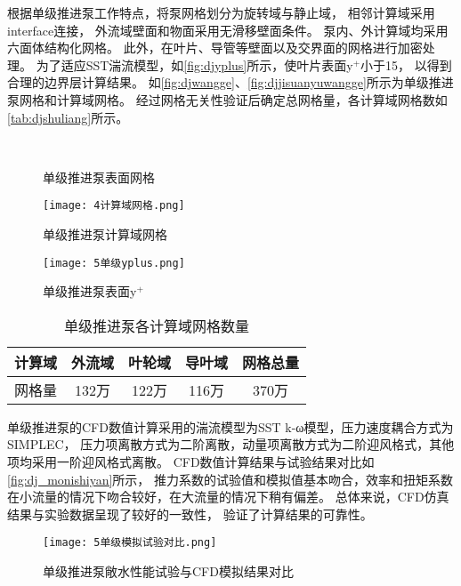 根据单级推进泵工作特点，将泵网格划分为旋转域与静止域，
相邻计算域采用interface连接，
外流域壁面和物面采用无滑移壁面条件。
泵内、外计算域均采用六面体结构化网格。
此外，在叶片、导管等壁面以及交界面的网格进行加密处理。
为了适应SST湍流模型，如\autoref{fig:djyplus}所示，使叶片表面y$^+$小于15，
以得到合理的边界层计算结果。
如\autoref{fig:djwangge}、\autoref{fig:djjisuanyuwangge}所示为单级推进泵网格和计算域网格。
经过网格无关性验证后确定总网格量，各计算域网格数如\autoref{tab:djshuliang}所示。
\begin{figure}[htbp]
    \centering
    \caption{\label{fig:djwangge}单级推进泵表面网格}
\end{figure}
\begin{figure}[htbp]
    \centering
    \texttt{[image: 4计算域网格.png]}
    \caption{\label{fig:djjisuanyuwangge}单级推进泵计算域网格}
\end{figure}
\begin{figure}[htbp]
    \centering
    \texttt{[image: 5单级yplus.png]}
    \caption{\label{fig:djyplus}单级推进泵表面y$^+$}
\end{figure}
\begin{table}[htbp]
    \centering
    \caption{\label{tab:djshuliang}单级推进泵各计算域网格数量}
    \begin{tabular}{ccccc}
        \toprule
        计算域 & 外流域 & 叶轮域 & 导叶域  & 网格总量 \\
        \midrule
        网格量 & 132万 & 122万 & 116万 & 370万 \\
        \bottomrule
    \end{tabular}
\end{table}

单级推进泵的CFD数值计算采用的湍流模型为SST k-ω模型，压力速度耦合方式为SIMPLEC，
压力项离散方式为二阶离散，动量项离散方式为二阶迎风格式，其他项均采用一阶迎风格式离散\cite{rao2012,bai2020}。
CFD数值计算结果与试验结果对比如\autoref{fig:dj_monishiyan}所示，
推力系数的试验值和模拟值基本吻合，效率和扭矩系数在小流量的情况下吻合较好，在大流量的情况下稍有偏差。
总体来说，CFD仿真结果与实验数据呈现了较好的一致性，
验证了计算结果的可靠性。
\begin{figure}[htbp]
    \centering
    \texttt{[image: 5单级模拟试验对比.png]}
    \caption{\label{fig:dj_monishiyan}单级推进泵敞水性能试验与CFD模拟结果对比}
\end{figure}

